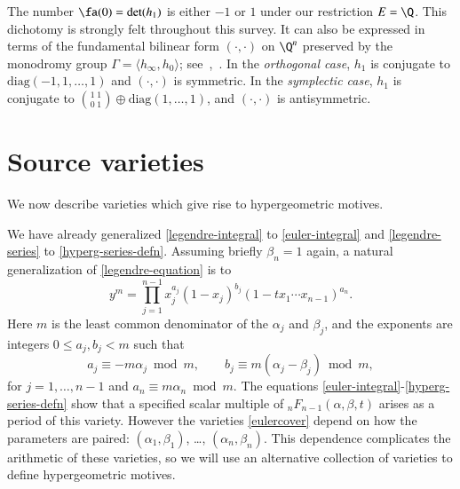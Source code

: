 \documentclass{notices}
\numberwithin{equation}{section}
\numberwithin{table}{section}
\numberwithin{figure}{section}
\begin{document}
The number $\fa(0)=\det(h_1)$ is either $-1$ or $1$ under our
restriction $E=\Q$.  This dichotomy is strongly felt throughout this
survey.  It can also be expressed in terms of the fundamental
bilinear form $\left( \cdot, \cdot \right)$ on $\Q^n$ preserved by the
monodromy group $\Gamma = \langle h_\infty,h_0 \rangle$; 
see~\cite[\S4]{BH},~\cite[\S3.5]{RV-bez}.
In the {\em orthogonal case}, $h_1$ is conjugate to
$\mbox{diag}(-1,1,\dots,1)$ and $\left( \cdot,\cdot \right)$ is
symmetric.  In the {\em symplectic case}, $h_1$ is conjugate to
$\binom{1 \; 1}{0 \; 1} \oplus \mbox{diag}(1,\dots,1)$, and
$\left( \cdot,\cdot \right)$ is antisymmetric.



 




    




















\section{Source varieties} 
\label{varieties} We now describe varieties which give rise 
to hypergeometric motives. 

 We have already generalized \eqref{legendre-integral}
to \eqref{euler-integral} and \eqref{legendre-series} to 
\eqref{hyperg-series-defn}.    Assuming briefly $\beta_n=1$ again, 
a natural generalization of \eqref{legendre-equation} is
to 
\begin{equation}
\label{eulercover}
y^m=\prod_{j=1}^{n-1}x_j^{a_j}(1-x_j)^{b_j}(1-tx_1\cdots x_{n-1})^{a_n}.
\end{equation}
Here $m$ is the least common denominator of the $\alpha_j$ and $\beta_j$,
and the exponents are integers $0\leq a_j,b_j<m$ such that 
$$
a_j\equiv -m\alpha_j\bmod m, \qquad b_j\equiv
m(\alpha_j-\beta_j)\bmod m,
$$ 
for $j=1,\ldots,n-1$ and $a_n\equiv m \alpha_n\bmod m$.  
The equations \eqref{euler-integral}-\eqref{hyperg-series-defn} show that a 
specified scalar multiple of ${}_nF_{n-1}(\alpha,\beta,t)$ arises as a period of 
this variety.  However the varieties \eqref{eulercover} depend on how
the parameters are paired: 
$(\alpha_1,\beta_1)$, \dots, $(\alpha_n,\beta_n)$.
This dependence complicates the arithmetic 
of these varieties, so we will use an alternative
collection of varieties to define 
hypergeometric motives.  
\end{document}
